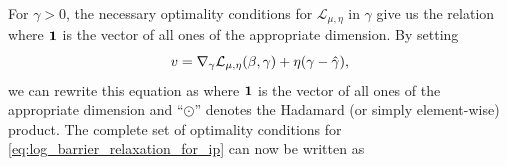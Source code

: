 

For $\gamma>0$, the necessary optimality conditions 
for $\mathcal{L}_{\mu,\eta}$ in $\gamma$ give us the relation 
where $\mathbf{1}$ is the vector of all ones of the 
appropriate dimension.
By setting 
\[
v=\nabla_\gamma \mathcal{L}_{\mu,\eta}(\beta,\gamma)+\eta(\gamma - \hat \gamma),
\] 
we can rewrite this equation as
where $\mathbf{1}$ is the vector of all ones of the appropriate dimension and
``$\odot$'' denotes the Hadamard (or simply element-wise) product.
The complete set of optimality conditions for 
\eqref{eq:log_barrier_relaxation_for_ip} can now be written as
